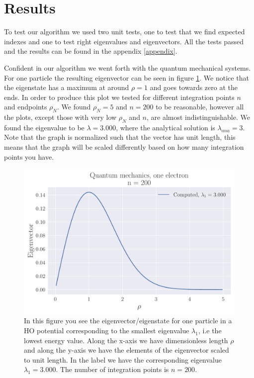 \documentclass[reprint,english,notitlepage,nofootinbib]{revtex4-1}  %
\begin{document}
\section{Results}

To test our algorithm we used two unit tests, one to test that we find expected indexes and one to test right eigenvalues and eigenvectors. All the tests passed and the results can be found in the appendix \ref{appendix}.

Confident in our algorithm we went forth with the quantum mechanical systems. For one particle the resulting eigenvector can be seen in figure \ref{fig:QM200}. We notice that the eigenstate has a maximum at around $\rho = 1$ and goes towards zero at the ends. In order to produce this plot we tested for different integration points $n$ and endpoints $\rho_N$. We found $\rho_N= 5$ and $n=200$ to be reasonable, however all the plots, except those with very low $\rho_N$ and $n$, are almost indistinguishable. We found the eigenvalue to be $\lambda = 3.000$, where the analytical solution is $\lambda_{ana} = 3$. Note that the graph is normalized such that the vector has unit length, this means that the graph will be scaled differently based on how many integration points you have.

\begin{figure}[h]
	\centering
	\includegraphics[width=\linewidth]{../output/QM1_200_0.pdf}
	\caption{In this figure you see the eigenvector/eigenstate for one particle in a HO potential corresponding to the smallest eigenvalue $\lambda_1$, i.e the lowest energy value. Along the x-axis we have dimensionless length $\rho$ and along the y-axis we have the elements of the eigenvector scaled to unit length. In the label we have the corresponding eigenvalue $\lambda_1 = 3.000$. The number of integration points is $n = 200$.}
  \label{fig:QM200}
\end{figure}
\end{document}
